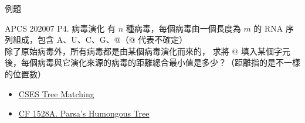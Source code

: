 \documentclass[aspectratio=169]{beamer}
\begin{document}
    \begin{frame}{例題}
        \begin{block}{APCS 202007 P4. 病毒演化}
            有 $n$ 種病毒，每個病毒由一個長度為 $m$ 的 RNA 序列組成，包含 A、U、C、G、@（@ 代表不確定）\\
            除了原始病毒外，所有病毒都是由某個病毒演化而來的，
            求將 $@$ 填入某個字元後，每個病毒與它演化來源的病毒的距離總合最小值是多少？（距離指的是不一樣的位置數）
        \end{block}
        \begin{itemize}
            \item \href{https://cses.fi/problemset/task/1130}{CSES Tree Matching}
            \item \href{https://codeforces.com/problemset/problem/1528/A}{CF 1528A. Parsa's Humongous Tree}
        \end{itemize}
    \end{frame}
\end{document}
